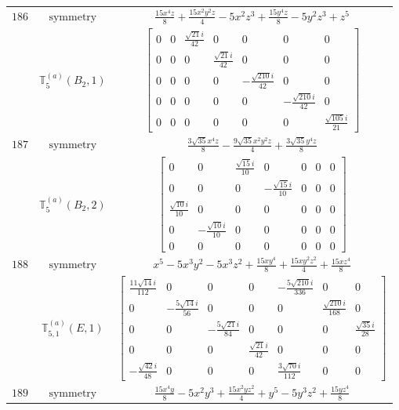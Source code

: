 \documentclass[fleqn,8pt,landscape]{jsarticle}
\begin{document}
\begin{longtable}{ccc}
$ 186 $ & $ \text{symmetry} $ & $ \frac{15 x^{4} z}{8} + \frac{15 x^{2} y^{2} z}{4} - 5 x^{2} z^{3} + \frac{15 y^{4} z}{8} - 5 y^{2} z^{3} + z^{5} $ \\
$  $ & $ \mathbb{T}_{5}^{(a)}(B_{2},1) $ & $ \begin{bmatrix} 0 & 0 & \frac{\sqrt{21} i}{42} & 0 & 0 & 0 & 0 \\ 0 & 0 & 0 & \frac{\sqrt{21} i}{42} & 0 & 0 & 0 \\ 0 & 0 & 0 & 0 & - \frac{\sqrt{210} i}{42} & 0 & 0 \\ 0 & 0 & 0 & 0 & 0 & - \frac{\sqrt{210} i}{42} & 0 \\ 0 & 0 & 0 & 0 & 0 & 0 & \frac{\sqrt{105} i}{21} \end{bmatrix} $ \\ \hline
$ 187 $ & $ \text{symmetry} $ & $ \frac{3 \sqrt{35} x^{4} z}{8} - \frac{9 \sqrt{35} x^{2} y^{2} z}{4} + \frac{3 \sqrt{35} y^{4} z}{8} $ \\
$  $ & $ \mathbb{T}_{5}^{(a)}(B_{2},2) $ & $ \begin{bmatrix} 0 & 0 & \frac{\sqrt{15} i}{10} & 0 & 0 & 0 & 0 \\ 0 & 0 & 0 & - \frac{\sqrt{15} i}{10} & 0 & 0 & 0 \\ \frac{\sqrt{10} i}{10} & 0 & 0 & 0 & 0 & 0 & 0 \\ 0 & - \frac{\sqrt{10} i}{10} & 0 & 0 & 0 & 0 & 0 \\ 0 & 0 & 0 & 0 & 0 & 0 & 0 \end{bmatrix} $ \\ \hline
$ 188 $ & $ \text{symmetry} $ & $ x^{5} - 5 x^{3} y^{2} - 5 x^{3} z^{2} + \frac{15 x y^{4}}{8} + \frac{15 x y^{2} z^{2}}{4} + \frac{15 x z^{4}}{8} $ \\
$  $ & $ \mathbb{T}_{5,1}^{(a)}(E,1) $ & $ \begin{bmatrix} \frac{11 \sqrt{14} i}{112} & 0 & 0 & 0 & - \frac{5 \sqrt{210} i}{336} & 0 & 0 \\ 0 & - \frac{5 \sqrt{14} i}{56} & 0 & 0 & 0 & \frac{\sqrt{210} i}{168} & 0 \\ 0 & 0 & - \frac{5 \sqrt{21} i}{84} & 0 & 0 & 0 & \frac{\sqrt{35} i}{28} \\ 0 & 0 & 0 & \frac{\sqrt{21} i}{42} & 0 & 0 & 0 \\ - \frac{\sqrt{42} i}{48} & 0 & 0 & 0 & \frac{3 \sqrt{70} i}{112} & 0 & 0 \end{bmatrix} $ \\ \hline
$ 189 $ & $ \text{symmetry} $ & $ \frac{15 x^{4} y}{8} - 5 x^{2} y^{3} + \frac{15 x^{2} y z^{2}}{4} + y^{5} - 5 y^{3} z^{2} + \frac{15 y z^{4}}{8} $ \\

\end{longtable}
\end{document}
